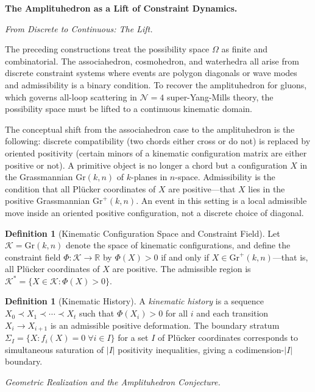 \documentclass[11pt]{article}
\theoremstyle{plain}
\theoremstyle{definition}
\newtheorem{definition}[theorem]{Definition}
\theoremstyle{remark}
\newcommand{\R}{\mathbb{R}}
\newcommand{\Gr}{\mathrm{Gr}}
\newcommand{\Phif}{\Phi}
\newcommand{\OmKS}{\Omega}
\begin{document}
\bigskip\noindent\textbf{The Amplituhedron as a Lift of Constraint Dynamics.}
\label{sec:amplituhedron}

\medskip\noindent\textit{From Discrete to Continuous: The Lift.}

The preceding constructions treat the possibility space $\OmKS$ as finite and combinatorial. The associahedron, cosmohedron, and waterhedra all arise from discrete constraint systems where events are polygon diagonals or wave modes and admissibility is a binary condition. To recover the amplituhedron for gluons, which governs all-loop scattering in $\mathcal{N}=4$ super-Yang-Mills theory, the possibility space must be lifted to a continuous kinematic domain.

The conceptual shift from the associahedron case to the amplituhedron is the following: discrete compatibility (two chords either cross or do not) is replaced by oriented positivity (certain minors of a kinematic configuration matrix are either positive or not). A primitive object is no longer a chord but a configuration $X$ in the Grassmannian $\Gr(k,n)$ of $k$-planes in $n$-space. Admissibility is the condition that all Pl\"ucker coordinates of $X$ are positive---that $X$ lies in the positive Grassmannian $\mathrm{Gr}^+(k,n)$. An event in this setting is a local admissible move inside an oriented positive configuration, not a discrete choice of diagonal.

\begin{definition}[Kinematic Configuration Space and Constraint Field]
Let $\mathcal{K} = \Gr(k,n)$ denote the space of kinematic configurations, and define the constraint field $\Phif: \mathcal{K} \to \R$ by $\Phif(X) > 0$ if and only if $X \in \mathrm{Gr}^+(k,n)$---that is, all Pl\"ucker coordinates of $X$ are positive. The admissible region is $\mathcal{K}^* = \{X \in \mathcal{K} : \Phif(X) > 0\}$.
\end{definition}

\begin{definition}[Kinematic History]
A \emph{kinematic history} is a sequence $X_0 \prec X_1 \prec \cdots \prec X_t$ such that $\Phif(X_i) > 0$ for all $i$ and each transition $X_i \to X_{i+1}$ is an admissible positive deformation. The boundary stratum $\Sigma_I = \{X : f_i(X) = 0 \; \forall i \in I\}$ for a set $I$ of Pl\"ucker coordinates corresponds to simultaneous saturation of $|I|$ positivity inequalities, giving a codimension-$|I|$ boundary.
\end{definition}

\medskip\noindent\textit{Geometric Realization and the Amplituhedron Conjecture.}
\end{document}
